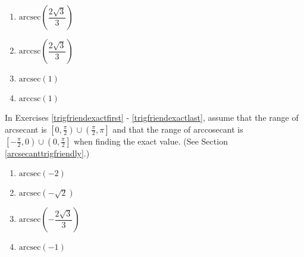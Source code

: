 \documentclass{ximera}
\begin{document}
\begin{multicols}{4}

\begin{enumerate}

\setcounter{enumi}{\value{HW}}

\item $\mbox{arcsec} \left( \dfrac{2\sqrt{3}}{3} \right)$
\item $\mbox{arccsc} \left( \dfrac{2\sqrt{3}}{3} \right)$
\item $\mbox{arcsec} \left( 1 \right)$ 
\item $\mbox{arccsc} \left( 1 \right)$  \label{exactvaluearclast}

\setcounter{HW}{\value{enumi}}

\end{enumerate}

\end{multicols}

In Exercises \ref{trigfriendexactfirst} - \ref{trigfriendexactlast}, assume that the range of arcsecant is $\left[0, \frac{\pi}{2} \right) \cup \left( \frac{\pi}{2}, \pi \right]$ and that the range of arccosecant is
$\left[ -\frac{\pi}{2}, 0 \right)  \cup \left(0, \frac{\pi}{2} \right]$ when finding the exact value. (See Section \ref{arcsecanttrigfriendly}.)

\begin{multicols}{4} 

\begin{enumerate}

\setcounter{enumi}{\value{HW}}

\item $\mbox{arcsec} \left( -2 \right)$  \label{trigfriendexactfirst}
\item $\mbox{arcsec} \left( -\sqrt{2} \right)$  
\item $\mbox{arcsec} \left( -\dfrac{2\sqrt{3}}{3} \right)$
\item $\mbox{arcsec} \left( -1 \right)$  

\setcounter{HW}{\value{enumi}}

\end{enumerate}

\end{multicols}
\end{document}
